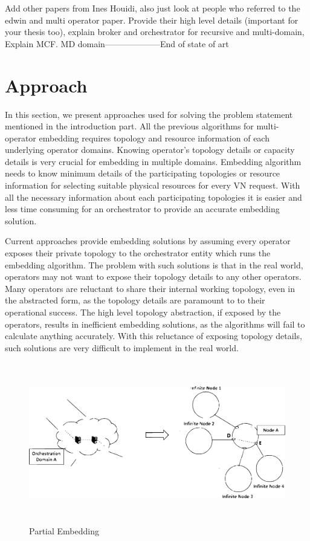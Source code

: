 \documentclass[article,dr=phil,type=msc ,colorback,accentcolor=tud4b]{tudthesis}
\begin{document}
Add other papers from Ines Houidi, also just look at people who referred to the edwin and multi operator paper. Provide their high level details (important for your thesis too), explain broker and orchestrator for recursive and multi-domain, Explain MCF. 
MD domain--------------------End of state of art



\newpage
\section{Approach}
In this section, we present approaches used for solving the problem statement mentioned in the introduction part. All the previous algorithms for multi-operator embedding requires topology and resource information of each underlying operator domains. Knowing operator's topology details or capacity details is very crucial for embedding in multiple domains. Embedding algorithm needs to know minimum details of the participating topologies or resource information for selecting suitable physical resources for every VN request. With all the necessary information about each participating topologies it is easier and less time consuming for an orchestrator to provide an accurate embedding solution. \newline

Current approaches provide embedding solutions by assuming every operator exposes their private topology to the orchestrator entity which runs the embedding algorithm. The problem with such solutions is that in the real world, operators may not want to expose their topology details to any other operators. Many operators are reluctant to share their internal working topology, even in the abstracted form, as the topology details are paramount to to their operational success. The high level topology abstraction, if exposed by the operators, results in inefficient embedding solutions, as the algorithms will fail to calculate anything accurately. With this reluctance of exposing topology details, such solutions are very difficult to implement in the real world.\newline  
\begin{figure}[h]
	\centering
	\includegraphics[width=15cm, height=7cm]{Part_embed}
	\caption{Partial Embedding}
	\label{fig: Partial_Embedding}
\end{figure}
\end{document}
